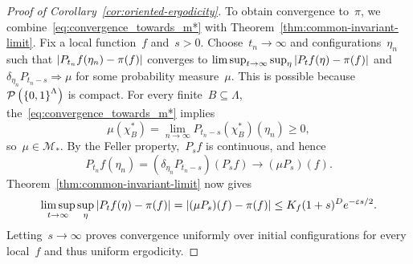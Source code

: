 \begin{proof}[Proof of Corollary~\ref{cor:oriented-ergodicity}]
To obtain convergence to~$\pi$, we combine~\eqref{eq:convergence_towards_m*}
with Theorem~\ref{thm:common-invariant-limit}.
Fix a local function~$f$ and~$s>0$. Choose~$t_n\to\infty$ and
configurations~$\eta_n$ such that
$\left|P_{t_n}f(\eta_n)-\pi(f)\right|$ converges to
$\limsup_{t\to\infty}\sup_\eta\left|P_tf(\eta)-\pi(f)\right|$ and
$\delta_{\eta_n}P_{t_n-s}\Rightarrow\mu$ for some probability measure~$\mu$. This is possible because~$\mathcal{P}\left(\left\{0,1\right\}^\Lambda\right)$ is compact.
For every finite~$B\subseteq\Lambda$, the~\eqref{eq:convergence_towards_m*} implies
\begin{equation*}
\mu(\chi_B^*)
=\lim_{n\to\infty}P_{t_n-s}(\chi_B^*)(\eta_n)\geq0,
\end{equation*}
so~$\mu\in\mathcal M_*$. By the Feller property,~$P_sf$ is continuous,
and hence
\begin{equation*}
P_{t_n}f(\eta_n)
=(\delta_{\eta_n}P_{t_n-s})(P_sf)
\longrightarrow(\mu P_s)(f).
\end{equation*}
Theorem~\ref{thm:common-invariant-limit} now gives
\begin{equation*}
\limsup_{t\to\infty}\sup_\eta\left|P_tf(\eta)-\pi(f)\right|
=\left|(\mu P_s)(f)-\pi(f)\right|
\leq K_f(1+s)^D e^{-\varepsilon s/2}.
\end{equation*}
Letting~$s\to\infty$ proves convergence uniformly over initial
configurations for every local~$f$ and thus uniform ergodicity.

\par
\end{proof}
